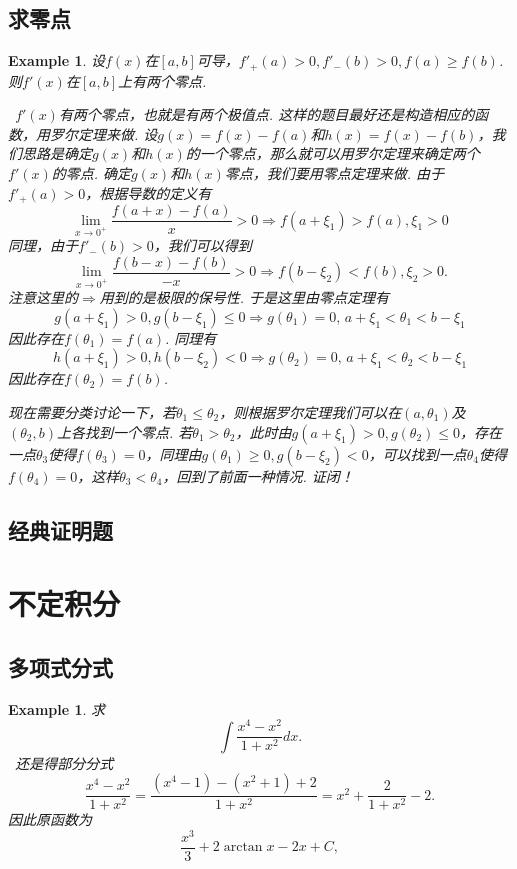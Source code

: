 \documentclass{article}
\newtheorem{example}[theorem]{Example}
\newcommand{\hints}{{\color{blue} \text{hints}}}
\begin{document}
\subsection{求零点}

\begin{example}
\rm 设$f(x)$在$[a,b]$可导，$f'_+(a) > 0, f'_-(b) > 0, f(a) \geq f(b)$. 则$f'(x)$在$[a,b]$上有两个零点. 

\hints\ $f'(x)$有两个零点，也就是有两个极值点. 这样的题目最好还是构造相应的函数，用罗尔定理来做. 设$g(x) = f(x)-f(a)$和$h(x)=f(x)-f(b)$，我们思路是确定$g(x)$和$h(x)$的一个零点，那么就可以用罗尔定理来确定两个$f'(x)$的零点. 确定$g(x)$和$h(x)$零点，我们要用零点定理来做. 由于$f'_+(a) > 0$，根据导数的定义有
$$
\lim\limits_{x \to 0^+} \frac{f(a+x)-f(a)}{x} > 0 \Rightarrow f(a + \xi_1) > f(a),\xi_1 > 0
$$  
同理，由于$f'_-(b) > 0$，我们可以得到
$$
\lim\limits_{x \to 0^+} \frac{f(b-x)-f(b)}{-x} > 0 \Rightarrow f(b - \xi_2) < f(b), \xi_2 > 0.
$$
注意这里的$\Rightarrow$用到的是极限的保号性. 于是这里由零点定理有
$$
g(a + \xi_1) > 0, g(b-\xi_1) \leq 0 \Rightarrow g(\theta_1) = 0, \,a+\xi_1 < \theta_1 < b-\xi_1
$$
因此存在$f(\theta_1) = f(a)$. 同理有
$$
h(a+\xi_1) > 0, h(b-\xi_2) < 0 \Rightarrow g(\theta_2) = 0, \,a+\xi_1 < \theta_2 < b-\xi_1
$$
因此存在$f(\theta_2) = f(b)$.  

现在需要分类讨论一下，若$\theta_1  \leq \theta_2$，则根据罗尔定理我们可以在$(a,\theta_1)$及$(\theta_2,b)$上各找到一个零点. 若$\theta_1 > \theta_2$，此时由$g(a+\xi_1) > 0, g(\theta_2) \leq 0$，存在一点$\theta_3$使得$f(\theta_3) = 0$，同理由$g(\theta_1) \geq 0, g(b-\xi_2) < 0$，可以找到一点$\theta_4$使得$f(\theta_4) = 0$，这样$\theta_3 < \theta_4$，回到了前面一种情况. 证闭！
\end{example}

\subsection{经典证明题}


\newpage
\section{不定积分}

\subsection{多项式分式}

\begin{example}
\rm 求
$$
\int \frac{x^4-x^2}{1+x^2}dx.
$$
\hints\ 还是得部分分式
$$
\frac{x^4-x^2}{1+x^2} = \frac{(x^4-1) -(x^2+1) + 2 }{1+x^2}
= x^2 + \frac{2}{1+x^2}-2.
$$
因此原函数为
$$
\frac{x^3}{3} + 2\arctan x - 2x + C,
$$ 
\end{example}
\end{document}
